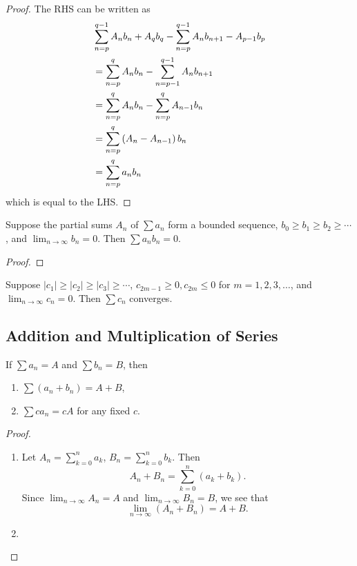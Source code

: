 \begin{proof}
The RHS can be written as
\begin{align*}
&\sum_{n=p}^{q-1}A_nb_n+A_qb_q-\sum_{n=p}^{q-1}A_nb_{n+1}-A_{p-1}b_p\\
&=\sum_{n=p}^{q}A_nb_n-\sum_{n=p-1}^{q-1}A_nb_{n+1}\\
&=\sum_{n=p}^{q}A_nb_n-\sum_{n=p}^{q}A_{n-1}b_n\\
&=\sum_{n=p}^{q}\left(A_n-A_{n-1}\right)b_n\\
&=\sum_{n=p}^{q}a_nb_n
\end{align*}
which is equal to the LHS.
\end{proof}

\begin{proposition}
Suppose the partial sums $A_n$ of $\sum a_n$ form a bounded sequence, $b_0\ge b_1\ge b_2\ge\cdots$, and $\displaystyle\lim_{n\to\infty}b_n=0$. Then $\sum a_nb_n=0$.
\end{proposition}

\begin{proof}

\end{proof}

\begin{proposition}
Suppose $|c_1|\ge|c_2|\ge|c_3|\ge\cdots$, $c_{2m-1}\ge0,c_{2m}\le0$ for $m=1,2,3,\dots$, and $\displaystyle\lim_{n\to\infty}c_n=0$. Then $\sum c_n$ converges.
\end{proposition}

\subsection{Addition and Multiplication of Series}
\begin{proposition}
If $\sum a_n=A$ and $\sum b_n=B$, then
\begin{enumerate}[label=(\roman*)]
\item $\sum(a_n+b_n)=A+B$,
\item $\sum ca_n=cA$ for any fixed $c$.
\end{enumerate}
\end{proposition}

\begin{proof} \
\begin{enumerate}[label=(\roman*)]
\item Let $A_n=\sum_{k=0}^{n}a_k$, $B_n=\sum_{k=0}^{n}b_k$. Then
\[A_n+B_n=\sum_{k=0}^{n}(a_k+b_k).\]
Since $\lim_{n\to\infty}A_n=A$ and $\lim_{n\to\infty}B_n=B$, we see that
\[\lim_{n\to\infty}(A_n+B_n)=A+B.\]
\item 
\end{enumerate}
\end{proof}

